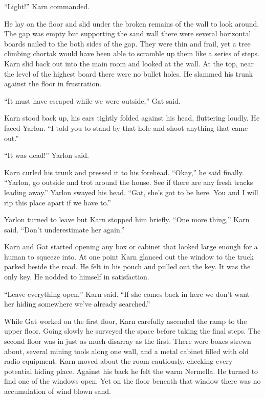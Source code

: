 ``Light!'' Karn commanded.

He lay on the floor and slid under the broken remains of the wall to look around. The gap was
empty but supporting the sand wall there were several horizontal boards nailed to the both sides
of the gap. They were thin and frail, yet a tree climbing chortak would have been able to
scramble up them like a series of steps. Karn slid back out into the main room and looked at the
wall. At the top, near the level of the highest board there were no bullet holes. He slammed his
trunk against the floor in frustration.

``It must have escaped while we were outside,'' Gat said.

Karn stood back up, his ears tightly folded against his head, fluttering loudly. He faced
Yarlon. ``I told you to stand by that hole and shoot anything that came out.''

``It was dead!'' Yarlon said.

Karn curled his trunk and pressed it to his forehead. ``Okay,'' he said finally. ``Yarlon, go
outside and trot around the house. See if there are any fresh tracks leading away.'' Yarlon
swayed his head. ``Gat, she's got to be here. You and I will rip this place apart if we have
to.''

Yarlon turned to leave but Karn stopped him briefly. ``One more thing,'' Karn said. ``Don't
underestimate her again.''

Karn and Gat started opening any box or cabinet that looked large enough for a human to squeeze
into. At one point Karn glanced out the window to the truck parked beside the road. He felt in
his pouch and pulled out the key. It was the only key. He nodded to himself in satisfaction.

``Leave everything open,'' Karn said. ``If she comes back in here we don't want her hiding
somewhere we've already searched.''

While Gat worked on the first floor, Karn carefully ascended the ramp to the upper floor. Going
slowly he surveyed the space before taking the final steps. The second floor was in just as much
disarray as the first. There were boxes strewn about, several mining tools along one wall, and a
metal cabinet filled with old radio equipment. Karn moved about the room cautiously, checking
every potential hiding place. Against his back he felt the warm Nermella. He turned to find one
of the windows open. Yet on the floor beneath that window there was no accumulation of wind
blown sand.

